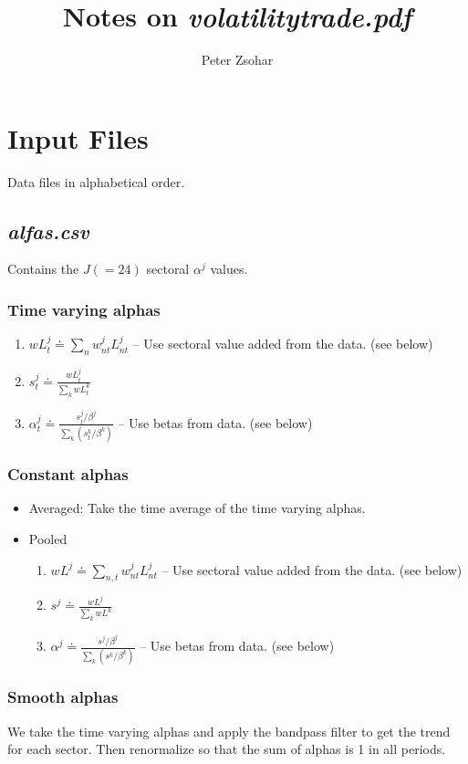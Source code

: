 \documentclass[11pt,oneside,a4paper]{article}
\title{Notes on \textsl{volatilitytrade.pdf}}
\author{Peter Zsohar}
\begin{document}
\maketitle

\section{Input Files}
Data files in alphabetical order.
\subsection{\textsl{alfas.csv}}
Contains the $J(=24)$ sectoral $\alpha^j$ values.
\subsubsection{Time varying alphas}
\begin{enumerate}
  \item $w\!L^j_{t} \doteq \sum_n w^j_{nt} L^j_{nt}$ -- Use sectoral value added from the data. (see below) 
  \item $s^j_{t} \doteq \frac{w\!L^j_{t}}{\sum_k w\!L^k_{t}}$
  \item $\alpha^j_t \doteq \frac{s^j_{t} / \beta^j}{\sum_k (s^k_{t} / \beta^k)}$ -- Use betas from data. (see below)
\end{enumerate}
\subsubsection{Constant alphas}
\begin{itemize}
  \item Averaged: Take the time average of the time varying alphas.
  \item Pooled
	\begin{enumerate}
  		\item $w\!L^j \doteq \sum_{n, t} w^j_{nt} L^j_{nt}$ -- Use sectoral value added from the data. (see below) 
  		\item $s^j \doteq \frac{w\!L^j}{\sum_k w\!L^k}$
  		\item $\alpha^j \doteq \frac{s^j / \beta^j}{\sum_k (s^k / \beta^k)}$ -- Use betas from data. (see below)
	\end{enumerate}
\end{itemize}
\subsubsection{Smooth alphas}
We take the time varying alphas and apply the bandpass filter to get the trend for each sector. Then renormalize so that the sum of alphas is 1 in all periods.
\end{document}
